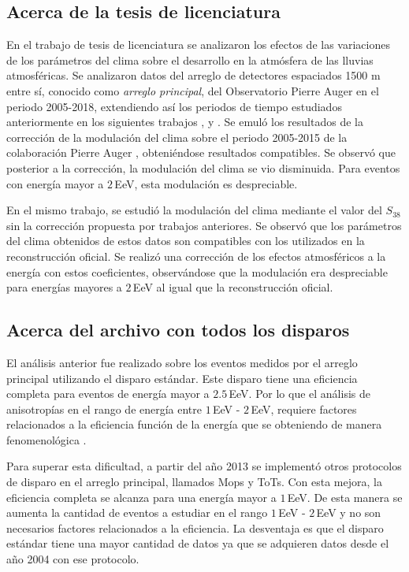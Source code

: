 
\subsection{Acerca de la tesis de licenciatura}

En el trabajo de tesis de licenciatura se analizaron los efectos de las variaciones de los parámetros del clima sobre el desarrollo en la atmósfera de las lluvias atmosféricas. Se analizaron datos del arreglo de detectores espaciados 1500 m entre sí, conocido como \emph{arreglo principal}, del Observatorio Pierre Auger en el periodo 2005-2018,  extendiendo  así los periodos de tiempo estudiados anteriormente en los siguientes trabajos \cite{abraham2009atmospheric}, \cite{abreu2012description}   y \cite{aab2017impact} . Se emuló los resultados de la corrección de la modulación del clima sobre el periodo 2005-2015 de la colaboración Pierre Auger \cite{aab2017impact}, obteniéndose resultados compatibles. Se observó que posterior a la corrección, la modulación del clima se vio disminuida. Para eventos con energía mayor a $2\,$EeV, esta modulación es despreciable.

En el mismo trabajo, se estudió la modulación del clima mediante el valor del $S_{38}$ sin la corrección propuesta por trabajos anteriores. Se observó que los parámetros del clima obtenidos de estos datos son compatibles con los utilizados en la reconstrucción oficial. Se realizó una corrección de los efectos atmosféricos a la energía con estos coeficientes, observándose que la modulación era despreciable para energías mayores a $2\,$EeV al igual que la reconstrucción oficial. 

\subsection{Acerca del archivo con todos los disparos}

El análisis anterior fue realizado sobre los eventos medidos por el arreglo principal utilizando el disparo estándar. Este disparo tiene una eficiencia completa para eventos de energía mayor a $2.5\,$EeV. Por lo que el análisis de anisotropías en el rango de energía entre $1\,$EeV - $2\,$EeV, requiere factores relacionados a la eficiencia función de la energía que se obteniendo de manera fenomenológica \cite{taborda}.

Para superar esta dificultad,  a partir del año 2013 se implementó otros protocolos de disparo en el arreglo principal, llamados Mops y ToTs. Con esta mejora, la eficiencia completa se alcanza para una energía mayor a $1\,$EeV. De esta manera se aumenta la cantidad de eventos a estudiar en el rango $1\,$EeV - $2\,$EeV y no son necesarios factores relacionados a la eficiencia. La desventaja es que el disparo estándar tiene una mayor cantidad de datos ya que se adquieren datos  desde el año 2004 con ese protocolo.

